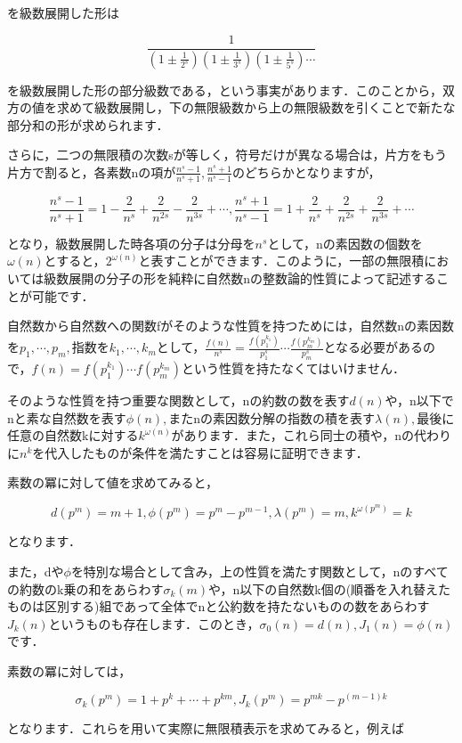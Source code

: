 \documentclass[./main]{subfiles}
\theoremstyle{break}
\begin{document}
を級数展開した形は

\[\frac{1}{\left( 1\pm \frac{1}{2^s} \right)\left( 1\pm \frac{1}{3^s} \right)\left( 1\pm\frac{1}{5^s} \right)\cdots}\]

を級数展開した形の部分級数である，という事実があります．このことから，双方の値を求めて級数展開し，下の無限級数から上の無限級数を引くことで新たな部分和の形が求められます．

さらに，二つの無限積の次数sが等しく，符号だけが異なる場合は，片方をもう片方で割ると，各素数nの項が$\displaystyle\frac{n^s-1}{n^s+1},\frac{n^s+1}{n^s-1}$のどちらかとなりますが，

\[\frac{n^s-1}{n^s+1}=1-\frac{2}{n^s}+\frac{2}{n^{2s}}-\frac{2}{n^{3s}}+\cdots,\frac{n^s+1}{n^s-1}=1+\frac{2}{n^s}+\frac{2}{n^{2s}}+\frac{2}{n^{3s}}+\cdots\]

となり，級数展開した時各項の分子は分母を$n^s$として，nの素因数の個数を$\omega(n)$とすると，$2^{\omega(n)}$と表すことができます．このように，一部の無限積においては級数展開の分子の形を純粋に自然数nの整数論的性質によって記述することが可能です．

自然数から自然数への関数fがそのような性質を持つためには，自然数nの素因数を$p_1,\cdots,p_m,$指数を$k_1,\cdots,k_m$として，$\displaystyle\frac{f(n)}{n^s}=\frac{f(p_1^{k_1})}{p_1^s}\cdots\frac{f(p_m^{k_m})}{p_m^s}$となる必要があるので，$f(n)=f(p_1^{k_1})\cdots f(p_m^{k_m})$という性質を持たなくてはいけません．

そのような性質を持つ重要な関数として，nの約数の数を表す$d(n)$や，n以下でnと素な自然数を表す$\phi(n),$またnの素因数分解の指数の積を表す$\lambda(n),$最後に任意の自然数kに対する$k^{\omega(n)}$があります．また，これら同士の積や，nの代わりに$n^k$を代入したものが条件を満たすことは容易に証明できます．

素数の冪に対して値を求めてみると，

\[d(p^m)=m+1,\phi(p^m)=p^m-p^{m-1},\lambda(p^m)=m,k^{\omega(p^m)}=k\]

となります．

また，dや$\phi$を特別な場合として含み，上の性質を満たす関数として，nのすべての約数のk乗の和をあらわす$\sigma_k(m)$や，n以下の自然数k個の(順番を入れ替えたものは区別する)組であって全体でnと公約数を持たないものの数をあらわす$J_k(n)$というものも存在します．このとき，$\sigma_0(n)=d(n),J_1(n)=\phi(n)$です．

素数の冪に対しては，

\[\sigma_k(p^m)=1+p^k+\cdots+p^{km},J_k(p^m)=p^{mk}-p^{(m-1)k}\]

となります．これらを用いて実際に無限積表示を求めてみると，例えば
\end{document}

